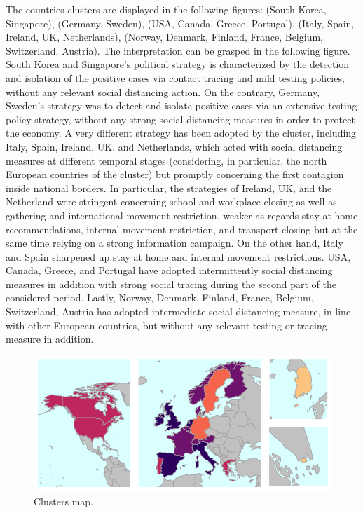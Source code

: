 \documentclass[
  6pt,
]{article}
\begin{document}
The countries clusters are displayed in the following figures: (South
Korea, Singapore), (Germany, Sweden), (USA, Canada, Greece, Portugal),
(Italy, Spain, Ireland, UK, Netherlands), (Norway, Denmark, Finland,
France, Belgium, Switzerland, Austria). The interpretation can be
grasped in the following figure. South Korea and Singapore's political
strategy is characterized by the detection and isolation of the positive
cases via contact tracing and mild testing policies, without any
relevant social distancing action. On the contrary, Germany, Sweden's
strategy was to detect and isolate positive cases via an extensive
testing policy strategy, without any strong social distancing measures
in order to protect the economy. A very different strategy has been
adopted by the cluster, including Italy, Spain, Ireland, UK, and
Netherlands, which acted with social distancing measures at different
temporal stages (considering, in particular, the north European
countries of the cluster) but promptly concerning the first contagion
inside national borders. In particular, the strategies of Ireland, UK,
and the Netherland were stringent concerning school and workplace
closing as well as gathering and international movement restriction,
weaker as regards stay at home recommendations, internal movement
restriction, and transport closing but at the same time relying on a
strong information campaign. On the other hand, Italy and Spain
sharpened up stay at home and internal movement restrictions. USA,
Canada, Greece, and Portugal have adopted intermittently social
distancing measures in addition with strong social tracing during the
second part of the considered period. Lastly, Norway, Denmark, Finland,
France, Belgium, Switzerland, Austria has adopted intermediate social
distancing measure, in line with other European countries, but without
any relevant testing or tracing measure in addition.

\begin{figure}
\centering
\includegraphics{maps.png}
\caption{Clusters map.}
\end{figure}
\end{document}

